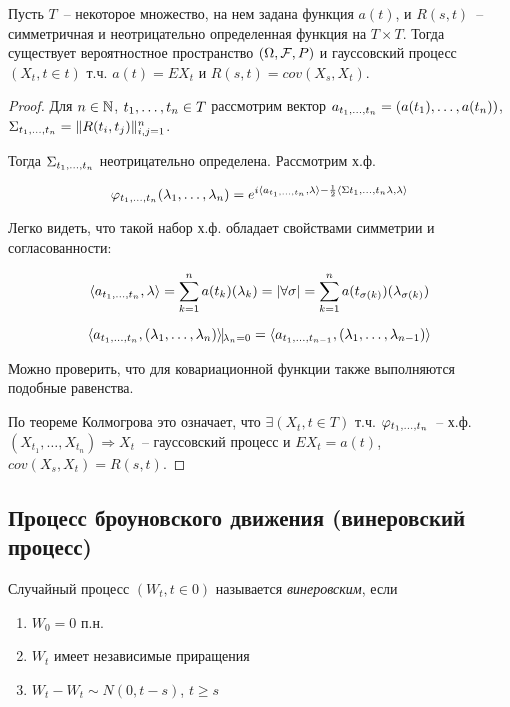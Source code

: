 \begin{theorem}
Пусть $T$~-- некоторое множество, на нем задана функция $a(t)$, и $R(s, t)$~-- симметричная и
неотрицательно определенная функция на $T \times T$. Тогда существует вероятностное пространство
$(\Omega, \mathcal{F}, P)$ и гауссовский процесс $(X_t, t \in t)$ т.ч. $a(t) = EX_t$ и
$R(s,t) =  cov(X_s, X_t)$.
\end{theorem}
\begin{proof}
Для $n \in \mathbb{N}$, $t_{1}, \dots, t_{n}  \in T$  рассмотрим вектор $a_{t_{1}, \dots, t_{n}} =
(a(t_1), \dots, a(t_n))$, $\Sigma_{t_{1}, \dots, t_{n}} = \Vert R(t_i, t_j) \Vert^n_{i,j=1}$.

Тогда $\Sigma_{t_{1}, \dots, t_{n}}$ неотрицательно определена. Рассмотрим х.ф.

$$\varphi_{t_{1}, \dots, t_{n}}(\lambda_{1}, \dots, \lambda_{n}) = e^{i \langle a_{t_{1}, \dots, t_{n}}, \lambda\rangle -
\frac12\langle\Sigma{t_{1}, \dots, t_{n}}\lambda, \lambda\rangle}$$

Легко видеть, что такой набор х.ф. обладает свойствами симметрии и согласованности:

$$\langle a_{t_{1}, \dots, t_{n}}, \lambda \rangle
= \sum_{k=1}^n a(t_k)(\lambda_k) = |\forall \sigma| =
\sum_{k=1}^n a(t_{\sigma(k)})(\lambda_{\sigma(k)})$$

$$\langle a_{\seq t 1 n}, (\seq \lambda 1 n)\rangle \vline_{\lambda_n = 0} =
\langle a_{\seq t 1 {n-1}}, (\seq \lambda 1 {n-1}) \rangle$$

Можно проверить, что для ковариационной функции также выполняются подобные равенства.

По теореме Колмогрова это означает, что $\exists (X_t, t \in T)$ т.ч.
$\varphi_{t_{1}, \dots, t_{n}}$~-- х.ф. $(X_{t_1}, \dots, X_{t_n}) \Rightarrow X_t$~-- гауссовский
процесс и $EX_t = a(t)$, $cov(X_s, X_t) = R(s,t)$.
\end{proof}

\subsection{Процесс броуновского движения (винеровский процесс)}

\begin{definition}
Случайный процесс $(W_t, t \in 0)$ называется \emph{винеровским}, если
\begin{enumerate}
\item $W_0 = 0$ п.н.
\item $W_t$ имеет независимые приращения
\item $W_t - W_t \sim N(0, t-s)$, $t \geq s$
\end{enumerate}
\end{definition}

